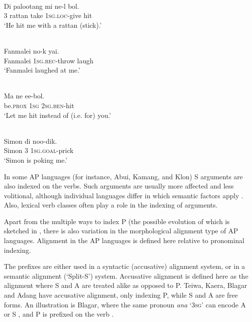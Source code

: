  

\ea%
\label{ex:1:9}
 \\
\gll Di   palootang   mi   ne-l     bol.  \\
 3   rattan     take   \textsc{1sg.loc-}give  hit  \\
\glt  `He hit me with a rattan (stick).'
\z
 

\ea%
\label{ex:1:10}
 \\
\gll Fanmalei   no-k       yai.  \\
Fanmalei   \textsc{1sg.rec-}throw   laugh   \\
\glt  `Fanmalei  laughed at me.'
\z
 


\ea%
\label{ex:1:11}
 \\
\gll Ma     ne   ee-bol. \\
 be.\textsc{prox}   \textsc{1sg}   \textsc{2sg.ben}{}-hit  \\
\glt  `Let me hit instead of (i.e. for) you.'
\z
 





\ea%
\label{ex:1:12}
 \\
\gll Simon   di   noo-dik. \\
 Simon   3   \textsc{1sg.goal}{}-prick  \\
\glt `Simon is poking me.'
\z
 




In some AP languages (for instance, Abui, Kamang, and Klon) S arguments are also indexed on the verbs. Such arguments are usually more affected and less volitional, although individual languages differ in which semantic factors apply \citep{FeddenEtAlTV,FeddenEtAl2014}. Also, lexical verb classes often play a role in the indexing of arguments. 

Apart from the multiple ways to index P (the possible evolution of which is sketched in \citet{KlamerKratochviltoappear}, there is also variation in the morphological alignment type of AP languages. Alignment in the AP languages is defined here relative to pronominal indexing. 

The prefixes are either used in a syntactic (accusative) alignment system, or in a semantic alignment (`Split-S') system. Accusative alignment is defined here as the alignment where S and A are treated alike as opposed to P. Teiwa, Kaera, Blagar and Adang have accusative alignment, only indexing P, while S and A are free forms. An illustration is Blagar, where the same pronoun \textit{{\textglotstop}}\textit{ana} `3\textsc{sg}' can encode A  or S , and P is prefixed on the verb .



